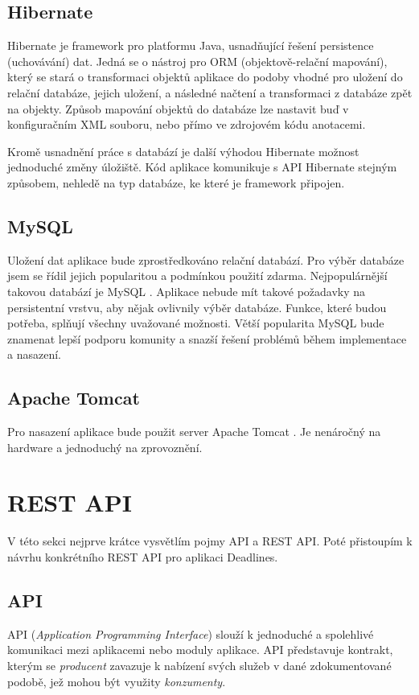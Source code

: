 \documentclass[thesis=B,czech]{FITthesis}[2012/06/26]
\begin{document}
		\subsection{Hibernate}
			Hibernate \cite{hibernate} je framework pro platformu Java, usnadňující řešení persistence (uchovávání) dat. Jedná se o nástroj pro ORM (objektově-relační mapování), který se stará o transformaci objektů aplikace do podoby vhodné pro uložení do relační databáze, jejich uložení, a následné načtení a transformaci z databáze zpět na objekty. Způsob mapování objektů do databáze lze nastavit buď v konfiguračním XML souboru, nebo přímo ve zdrojovém kódu anotacemi.
			
			Kromě usnadnění práce s databází je další výhodou Hibernate možnost jednoduché změny úložiště. Kód aplikace komunikuje s API Hibernate stejným způsobem, nehledě na typ databáze, ke které je framework připojen.
		
		\subsection{MySQL}
			Uložení dat aplikace bude zprostředkováno relační databází. Pro výběr databáze jsem se řídil jejich popularitou a podmínkou použití zdarma. Nejpopulárnější takovou databází je MySQL \cite{db-ranking}. Aplikace nebude mít takové požadavky na persistentní vrstvu, aby nějak ovlivnily výběr databáze. Funkce, které budou potřeba, splňují všechny uvažované možnosti. Větší popularita MySQL bude znamenat lepší podporu komunity a snazší řešení problémů během implementace a nasazení.
			
		\subsection{Apache Tomcat}
			Pro nasazení aplikace bude použit server Apache Tomcat \cite{tomcat}. Je nenáročný na hardware a jednoduchý na zprovoznění. 
		
	
	\section{REST API}
		V této sekci nejprve krátce vysvětlím pojmy API a REST API. Poté přistoupím k návrhu konkrétního REST API pro aplikaci Deadlines.
	
		\subsection{API}
			API (\textit{Application Programming Interface}) slouží k jednoduché a spolehlivé komunikaci mezi aplikacemi nebo moduly aplikace. API představuje kontrakt, kterým se \textit{producent} zavazuje k nabízení svých služeb v dané zdokumentované podobě, jež mohou být využity \textit{konzumenty}.
			
\end{document}
